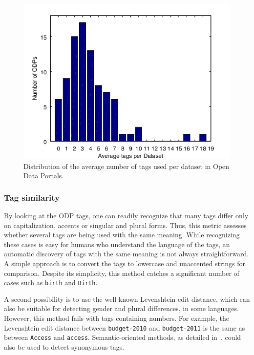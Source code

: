 \documentclass[conference]{IEEEtran}
\begin{document}
\begin{figure}[tb]
\begin{center}
\includegraphics[width=\columnwidth]{images/tags_per_dataset.png}
\caption{Distribution of the average number of tags used per dataset in Open Data Portals.}
\label{fig:tags_per_ds}
\end{center}
\end{figure}

\subsubsection{Tag similarity}
By looking at the ODP tags, one can readily recognize that many tags differ only on capitalization, accents or singular and plural forms.
Thus, this metric assesses whether several tags are being used with the same meaning.
While recognizing these cases is easy for humans who understand the language of the tags, an automatic discovery of tags with the same meaning is not always straightforward.
A simple approach is to convert the tags to lowercase and unaccented strings for comparison. 
Despite its simplicity, this method catches a significant number of cases such as \texttt{birth} and \texttt{Birth}.

A second possibility is to use the well known Levenshtein edit distance, which can also be suitable for detecting gender and plural differences, in some languages. 
However, this method fails with tags containing numbers. 
For example, the Levenshtein edit distance between \texttt{budget-2010} and \texttt{budget-2011} is the same as between \texttt{Access} and \texttt{access}.
Semantic-oriented methods, as detailed in~\cite{Harispe2015}, could also be used to detect synonymous tags.
\end{document}
